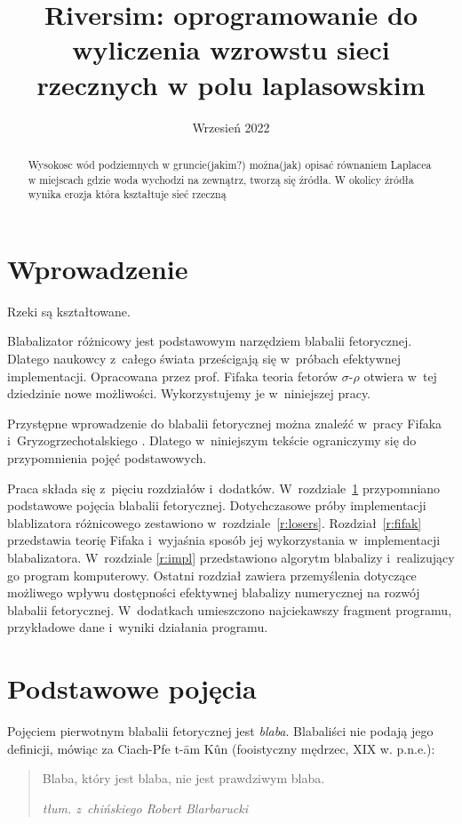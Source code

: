 \documentclass[magisterska]{pracamgr}
\title{Riversim: oprogramowanie do wyliczenia wzrowstu sieci rzecznych w polu laplasowskim}
\date{Wrzesień 2022}
\begin{document}
\maketitle

\begin{abstract}
  Wysokosc wód podziemnych w gruncie(jakim?) można(jak) opisać równaniem Laplacea w miejscach gdzie woda wychodzi na zewnątrz, tworzą się
  źródła. W okolicy źródła wynika erozja która kształtuje sieć rzeczną
\end{abstract}

\tableofcontents

\chapter*{Wprowadzenie}

Rzeki są kształtowane.

Blabalizator różnicowy jest podstawowym narzędziem blabalii
fetorycznej.  Dlatego naukowcy z~całego świata prześcigają się
w~próbach efektywnej implementacji.  Opracowana przez prof. Fifaka
teoria fetorów $\sigma$-$\rho$ otwiera w~tej dziedzinie nowe
możliwości.  Wykorzystujemy je w~niniejszej pracy.

Przystępne wprowadzenie do blabalii fetorycznej można znaleźć w~pracy
Fifaka i~Gryzogrzechotalskiego \cite{ffgg}.  Dlatego w~niniejszym
tekście ograniczymy się do przypomnienia pojęć podstawowych.

Praca składa się z~pięciu rozdziałów i~dodatków.
W~rozdziale~\ref{r:pojecia} przypomniano podstawowe pojęcia blabalii
fetorycznej.  Dotychczasowe próby implementacji blablizatora
różnicowego zestawiono w~rozdziale~\ref{r:losers}.
Rozdział~\ref{r:fifak} przedstawia teorię Fifaka i~wyjaśnia sposób jej
wykorzystania w~implementacji blabalizatora.  W~rozdziale \ref{r:impl}
przedstawiono algorytm blabalizy i~realizujący go program komputerowy.
Ostatni rozdział zawiera przemyślenia dotyczące możliwego wpływu
dostępności efektywnej blabalizy numerycznej na rozwój blabalii
fetorycznej.  W~dodatkach umieszczono najciekawszy fragment programu,
przykładowe dane i~wyniki działania programu.

\chapter{Podstawowe pojęcia}\label{r:pojecia}

Pojęciem pierwotnym blabalii fetorycznej jest \emph{blaba}.
Blabaliści nie podają jego definicji, mówiąc za Ciach-Pfe t-\=am
K\^un (fooistyczny mędrzec, XIX w. p.n.e.):
\begin{quote}
  Blaba, który jest blaba, nie jest prawdziwym blaba.

\raggedleft\slshape tłum. z~chińskiego Robert Blarbarucki
\end{quote}
\end{document}
